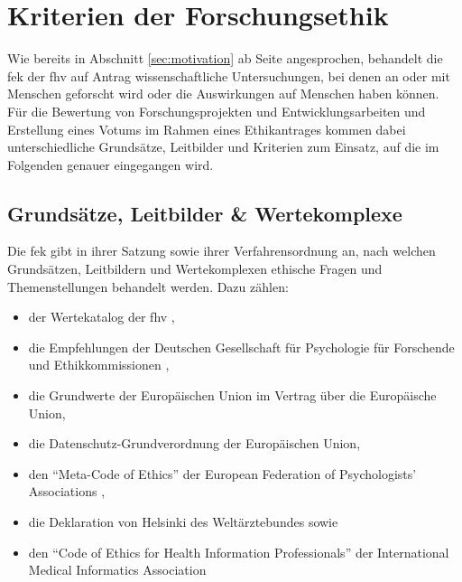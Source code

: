 \documentclass[a4paper,12pt,twoside]{scrreprt}
\begin{document}
\chapter{Kriterien der Forschungsethik}
\label{chap:kriterien-forschungsethik}

Wie bereits in Abschnitt \ref{sec:motivation} ab Seite \pageref{chap:einleitung} angesprochen, behandelt die \acl{fek} der \acl{fhv} auf Antrag wissenschaftliche Untersuchungen, bei denen an oder mit Menschen geforscht wird oder die Auswirkungen auf Menschen haben können. \cite{fachhochschule_vorarlberg_gmbh_forschungsethik-kommission_2021} Für die Bewertung von Forschungsprojekten und Entwicklungsarbeiten und Erstellung eines Votums im Rahmen eines Ethikantrages kommen dabei unterschiedliche Grundsätze, Leitbilder und Kriterien zum Einsatz, auf die im Folgenden genauer eingegangen wird.

\section{Grundsätze, Leitbilder \& Wertekomplexe}
\label{sec:grundsätze-leitbilder-wertekomplexe}

Die \ac{fek} gibt in ihrer Satzung \cite[1]{forschungsethik-kommission_der_fachhochschule_vorarlberg_satzung_2021} sowie ihrer Verfahrensordnung \cite[1\psq]{forschungsethik-kommission_der_fachhochschule_vorarlberg_verfahrensordnung_2020} an, nach welchen Grundsätzen, Leitbildern und Wertekomplexen ethische Fragen und Themenstellungen behandelt werden. Dazu zählen:
\begin{itemize}
    \item der Wertekatalog der \acl{fhv} \cite{kollegium_der_fachhochschule_vorarlberg_gmbh_wertekatalog_2022},
    \item die Empfehlungen der Deutschen Gesellschaft für Psychologie für Forschende und Ethikkommissionen \cite{deutsche_gesellschaft_fur_psychologie_ev_ethisches_2018},
    \item die Grundwerte der Europäischen Union im Vertrag über die Europäische Union,
    \item die Datenschutz-Grundverordnung der Europäischen Union,
    \item den \enquote{Meta-Code of Ethics} der European Federation of Psychologists' Associations \cite{european_federation_of_psychologists_associations_meta-code_2005},
    \item die Deklaration von Helsinki des Weltärztebundes \cite{world_medical_association_world_2013} sowie
    \item den \enquote{Code of Ethics for Health Information Professionals} der International Medical Informatics Association \cite{international_medical_informatics_association_imia_2016}
\end{itemize}
\end{document}
